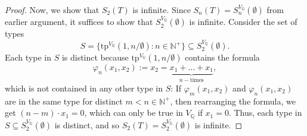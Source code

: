 \documentclass{article}
\begin{document}
\begin{enumerate}[label={\bf Q\arabic*:}]
\begin{proof}
      Now, we show that $S_2(T)$ is infinite. Since $S_n(T)=
      S_n^{V_{\mathbb{Q}}}(\emptyset)$ from earlier argument, it suffices
      to show that $S_2^{V_{\mathbb{Q}}}(\emptyset)$ is infinite. Consider
      the set of types \[S=\{\text{tp}^{V_\mathbb{Q}}(1,n/\emptyset):
      n\in\mathbb{N}^+\} \subseteq S_2^{V_{\mathbb{Q}}}(\emptyset).\] Each
      type in $S$ is distinct because
      $\text{tp}^{V_\mathbb{Q}}(1,n/\emptyset)$ contains the formula
      \[\varphi_n(x_1,x_2):=
      x_2=\underbrace{x_1+\ldots+x_1}_{n-\text{times}},\] which is not
      contained in any other type in $S$: If $\varphi_m(x_1,x_2)$ and
      $\varphi_n(x_1,x_2)$ are in the same type for distinct
      $m<n\in\mathbb{N}^+$, then rearranging the formula, we get
      $(n-m)\cdot x_1=0$, which can only be true in $V_\mathbb{Q}$ if
      $x_1=0$. Thus, each type in $S\subseteq
      S_2^{V_\mathbb{Q}}(\emptyset)$ is distinct, and so
      $S_2(T)=S_2^{V_\mathbb{Q}}(\emptyset)$ is infinite.
    \end{proof}
\end{enumerate}
\end{document}
